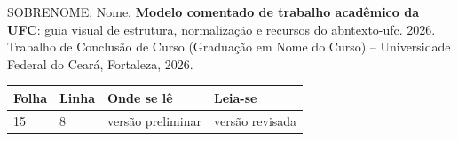 \noindent SOBRENOME, Nome. \textbf{Modelo comentado de trabalho acadêmico da UFC}: guia visual de estrutura, normalização e recursos do abntexto-ufc. 2026. Trabalho de Conclusão de Curso (Graduação em Nome do Curso) -- Universidade Federal do Ceará, Fortaleza, 2026.

\begin{center}
\begin{tabular}{p{1.5cm} p{1.5cm} p{4cm} p{4cm}}
\hline
\textbf{Folha} & \textbf{Linha} & \textbf{Onde se lê} & \textbf{Leia-se} \\
\hline
15 & 8 & versão preliminar & versão revisada \\
\hline
\end{tabular}
\end{center}
